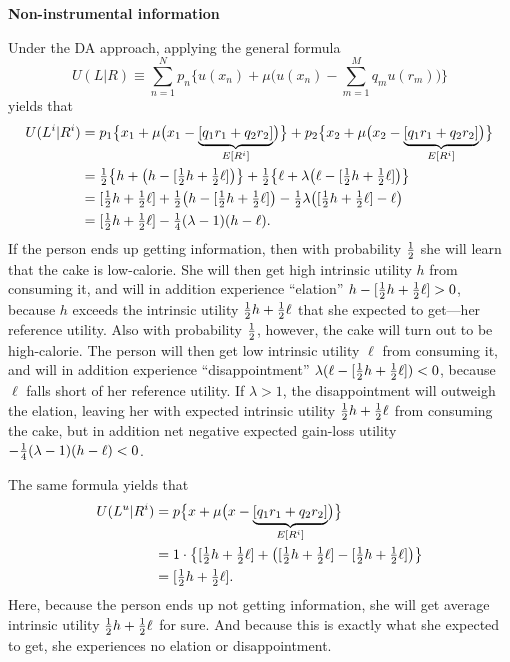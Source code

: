 \begin{center}
\textbf{Non-instrumental information}
\end{center}

Under the DA approach, applying the general formula
\begin{equation*}
  U(L|R) \equiv \sum_{n=1}^N p_n\biggl\{u(x_n) + \mu\biggl(u(x_n) - \sum_{m=1}^M q_m
u(r_m)\biggr)\biggr\}
\end{equation*}
yields that
\begin{align*}
  U(L^i|R^i)
&= p_1\bigl\{x_1 + \mu\bigl(x_1 - \underbrace{[q_1r_1 + q_2r_2]}_{E[R^i]}\bigr)\bigr\}
 + p_2\bigl\{x_2 + \mu\bigl(x_2 - \underbrace{[q_1r_1 + q_2r_2]}_{E[R^i]}\bigr)\bigr\}
\\
&= \tfrac{1}{2}\bigl\{h + \bigl(h - [\tfrac{1}{2} h + \tfrac{1}{2}\ell]\bigr)\bigr\}
 + \tfrac{1}{2}\bigl\{\ell + \lambda\bigl(\ell - [\tfrac{1}{2} h + \tfrac{1}{2} \ell]\bigr)\bigr\}
\\
&= [\tfrac{1}{2} h + \tfrac{1}{2} \ell] + \tfrac{1}{2}\bigl(h - [\tfrac{1}{2} h + \tfrac{1}{2}\ell]\bigr)
   - \tfrac{1}{2}\lambda\bigl([\tfrac{1}{2} h + \tfrac{1}{2} \ell] - \ell\bigr)
\\
&= [\tfrac{1}{2} h + \tfrac{1}{2} \ell] - \tfrac{1}{4}(\lambda - 1)(h - \ell).
\end{align*}
If the person ends up getting information, then with probability $\tfrac{1}{2}$ she
will learn that the cake is low-calorie. She will then get high intrinsic
utility $h$ from consuming it, and will in addition experience \enquote{elation} $h - [\tfrac{1}{2} h + \tfrac{1}{2}\ell] > 0$, because $h$ exceeds the intrinsic utility $\tfrac{1}{2} h + \tfrac{1}{2} \ell$ that she expected to get---her reference utility. Also with probability $\tfrac{1}{2}$, however, the cake will turn out to be high-calorie. The person will then get low intrinsic utility $\ell$ from consuming it, and will in addition experience \enquote{disappointment} $\lambda(\ell - [\tfrac{1}{2} h + \tfrac{1}{2}\ell]) < 0$, because $\ell$ falls short of her reference utility. If $\lambda > 1$, the disappointment will outweigh the elation, leaving her with expected intrinsic utility $\tfrac{1}{2} h + \tfrac{1}{2} \ell$ from consuming the cake, but in addition net negative expected gain-loss utility $- \tfrac{1}{4}(\lambda - 1)(h - \ell) < 0$.

The same formula yields that
\begin{align*}
  U(L^u|R^i)
&= p\bigl\{x + \mu\bigl(x - \underbrace{[q_1r_1 + q_2r_2]}_{E[R^i]}\bigr)\bigr\}
\\
&= 1\cdot\bigl\{[\tfrac{1}{2} h + \tfrac{1}{2} \ell] + \bigl([\tfrac{1}{2} h + \tfrac{1}{2} \ell] - [\tfrac{1}{2} h + \tfrac{1}{2} \ell]\bigr)\bigr\}\\
&= [\tfrac{1}{2} h + \tfrac{1}{2} \ell].
\end{align*}
Here, because the person ends up not getting information, she will get average
intrinsic utility $\tfrac{1}{2} h + \tfrac{1}{2} \ell$ for sure. And because this is exactly
what she expected to get, she experiences no elation or disappointment.

